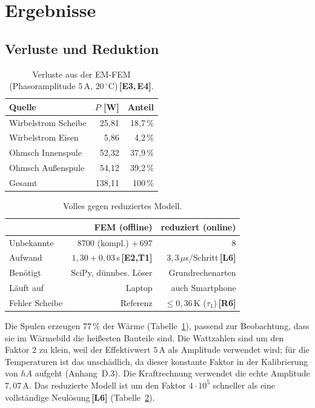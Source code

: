 \documentclass[a4paper, 10pt, conference]{ieeeconf}
\theoremstyle{remark}
\newcommand{\src}[1]{\,\textbf{[#1]}}
\begin{document}
\section{Ergebnisse}
\label{sec:results}

\subsection{Verluste und Reduktion}

\begin{table}[t]
\centering\footnotesize
\caption{Verluste aus der EM-FEM (Phasoramplitude $5\,$A, $20\,^\circ$C)\src{E3,\,E4}.}
\label{tab:losses}
\begin{tabular}{@{}lrr@{}}
\toprule
Quelle & $P$ [W] & Anteil \\
\midrule
Wirbelstrom Scheibe & 25{,}81 & 18{,}7\,\% \\
Wirbelstrom Eisen & 5{,}86 & 4{,}2\,\% \\
Ohmsch Innenspule & 52{,}32 & 37{,}9\,\% \\
Ohmsch Außenspule & 54{,}12 & 39{,}2\,\% \\
\midrule
Gesamt & 138{,}11 & 100\,\% \\
\bottomrule
\end{tabular}
\end{table}

\begin{table}[t]
\centering\footnotesize
\caption{Volles gegen reduziertes Modell.}
\label{tab:speed}
\begin{tabular}{@{}lrr@{}}
\toprule
 & FEM (offline) & reduziert (online) \\
\midrule
Unbekannte & $8700$ (kompl.) $+\,697$ & $8$ \\
Aufwand & $1{,}30+0{,}03\,$s\src{E2,T1} & $3{,}3\,\mu$s/Schritt\src{L6} \\
Benötigt & SciPy, dünnbes. Löser & Grundrechenarten \\
Läuft auf & Laptop & auch Smartphone \\
Fehler Scheibe & Referenz & $\le0{,}36\,$K ($\tau_1$)\src{R6} \\
\bottomrule
\end{tabular}
\end{table}

Die Spulen erzeugen $77\,\%$ der Wärme (Tabelle~\ref{tab:losses}), passend
zur Beobachtung, dass sie im Wärmebild die heißesten Bauteile sind. Die
Wattzahlen sind um den Faktor $2$ zu klein, weil der Effektivwert $5\,$A als
Amplitude verwendet wird; für die Temperaturen ist das unschädlich, da
dieser konstante Faktor in der Kalibrierung von $hA$ aufgeht (Anhang~D.3).
Die Kraftrechnung verwendet die echte Amplitude $7{,}07\,$A. Das reduzierte
Modell ist um den Faktor $4\cdot10^5$ schneller als eine vollständige
Neulösung\src{L6} (Tabelle~\ref{tab:speed}).
\end{document}
